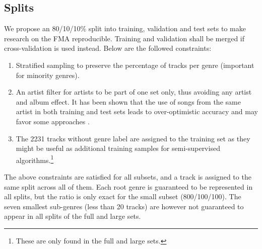 \documentclass{article}
\newcommand{\todo}[1]{{\color{red} #1}}
\begin{document}
\subsection{Splits}

We propose an 80/10/10\% split into training, validation and test sets to make research on the FMA reproducible. Training and validation shall be merged if cross-validation is used instead.
Below are the followed constraints:
\begin{enumerate}
	\item Stratified sampling to preserve the percentage of tracks per genre (important for minority genres).
	\item An artist filter for artists to be part of one set only, thus avoiding any artist and album effect. It has been shown that the use of songs from the same artist in both training and test sets leads to over-optimistic accuracy and may favor some approaches \cite{artist_filters_1, artist_filters_2}.
	\item The 2231 tracks without genre label are assigned to the training set as they might be useful as additional training samples for semi-supervised algorithms.\footnote{These are only found in the full and large sets.}
\end{enumerate}
The above constraints are satisfied for all subsets, and a track is assigned to the same split across all of them. Each root genre is guaranteed to be represented in all splits, but the ratio is only exact for the small subset (800/100/100). The seven smallest sub-genres (less than 20 tracks) are however not guaranteed to appear in all splits of the full and large sets.
\end{document}
